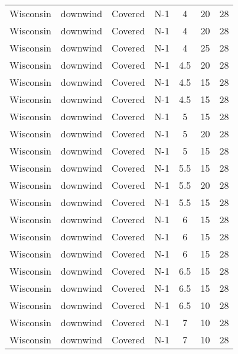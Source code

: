 \documentclass{article}
\begin{document}
\begin{longtable}[c]{ccccccc}
Wisconsin & downwind  & Covered     & N-1             & 4            & 20          & 28  \\
Wisconsin & downwind  & Covered     & N-1             & 4            & 20          & 28  \\
Wisconsin & downwind  & Covered     & N-1             & 4            & 25          & 28  \\
Wisconsin & downwind  & Covered     & N-1             & 4.5          & 20          & 28  \\
Wisconsin & downwind  & Covered     & N-1             & 4.5          & 15          & 28  \\
Wisconsin & downwind  & Covered     & N-1             & 4.5          & 15          & 28  \\
Wisconsin & downwind  & Covered     & N-1             & 5            & 15          & 28  \\
Wisconsin & downwind  & Covered     & N-1             & 5            & 20          & 28  \\
Wisconsin & downwind  & Covered     & N-1             & 5            & 15          & 28  \\
Wisconsin & downwind  & Covered     & N-1             & 5.5          & 15          & 28  \\
Wisconsin & downwind  & Covered     & N-1             & 5.5          & 20          & 28  \\
Wisconsin & downwind  & Covered     & N-1             & 5.5          & 15          & 28  \\
Wisconsin & downwind  & Covered     & N-1             & 6            & 15          & 28  \\
Wisconsin & downwind  & Covered     & N-1             & 6            & 15          & 28  \\
Wisconsin & downwind  & Covered     & N-1             & 6            & 15          & 28  \\
Wisconsin & downwind  & Covered     & N-1             & 6.5          & 15          & 28  \\
Wisconsin & downwind  & Covered     & N-1             & 6.5          & 15          & 28  \\
Wisconsin & downwind  & Covered     & N-1             & 6.5          & 10          & 28  \\
Wisconsin & downwind  & Covered     & N-1             & 7            & 10          & 28  \\
Wisconsin & downwind  & Covered     & N-1             & 7            & 10          & 28  \\

\end{longtable}
\end{document}
